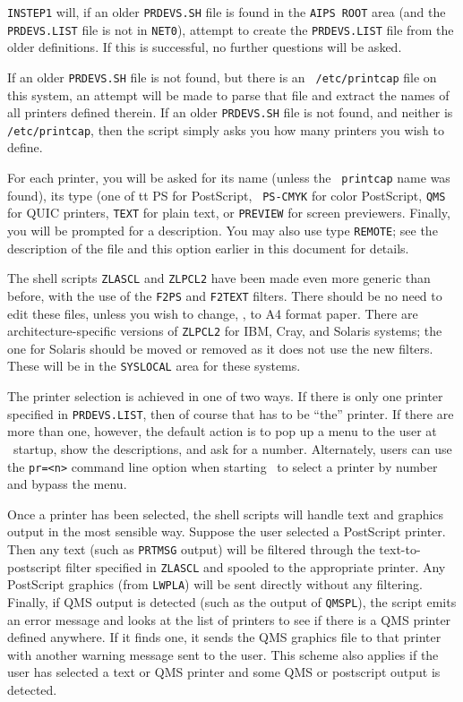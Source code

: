 {\tt INSTEP1} will, if an older {\tt PRDEVS.SH} file is found in the
{\tt\dol AIPS ROOT} area (and the {\tt PRDEVS.LIST} file is not in
{\tt\dol NET0}), attempt to create the {\tt PRDEVS.LIST} file from the older
definitions.  If this is successful, no further questions will be asked.

If an older {\tt PRDEVS.SH} file is not found, but there is an {\tt
/etc/printcap} file on this system, an attempt will be made to parse that
file and extract the names of all printers defined therein.  If an older
{\tt PRDEVS.SH} file is not found, and neither is {\tt /etc/printcap},
then the script simply asks you how many printers you wish to define.

For each printer, you will be asked for its name (unless the {\tt
printcap} name was found), its type (one of {tt PS} for PostScript, {\tt
PS-CMYK} for color PostScript, {\tt QMS} for QUIC printers, {\tt TEXT} for
plain text, or {\tt PREVIEW} for screen previewers.  Finally, you will be
prompted for a description.  You may also use type {\tt REMOTE}; see the
description of the file and this option earlier in this document for
details.

The shell scripts {\tt ZLASCL} and {\tt ZLPCL2} have been made even more
generic than before, with the use of the {\tt F2PS} and {\tt F2TEXT}
filters.  There should be no need to edit these files, unless you wish to
change, \eg, to A4 format paper.  There are architecture-specific versions
of {\tt ZLPCL2} for IBM, Cray, and Solaris systems; the one for Solaris
should be moved or removed as it does not use the new filters.  These will
be in the {\tt\dol SYSLOCAL} area for these systems.

The printer selection is achieved in one of two ways.  If there is only
one printer specified in {\tt PRDEVS.LIST}, then of course that has to be
``the'' printer.  If there are more than one, however, the default action
is to pop up a menu to the user at \AIPS\ startup, show the descriptions,
and ask for a number.  Alternately, users can use the {\tt pr=<n>} command
line option when starting \AIPS\ to select a printer by number and bypass
the menu.

Once a printer has been selected, the shell scripts will handle text
and graphics output in the most sensible way.  Suppose the user
selected a PostScript printer.  Then any text (such as {\tt PRTMSG}
output) will be filtered through the text-to-postscript filter
specified in {\tt ZLASCL} and spooled to the appropriate printer.  Any
PostScript graphics (from {\tt LWPLA}) will be sent directly without
any filtering.  Finally, if QMS output is detected (such as the output
of {\tt QMSPL}), the script emits an error message and looks at the
list of printers to see if there is a QMS printer defined anywhere.
If it finds one, it sends the QMS graphics file to that printer with
another warning message sent to the user.  This scheme also applies if
the user has selected a text or QMS printer and some QMS or postscript
output is detected.

